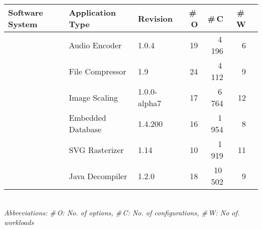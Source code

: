\begin{tabularx}{\linewidth}{lllrrrr}
		\toprule
		\textbf{Software System} &  \textbf{Application Type} & \textbf{Revision} & \textbf{ \#\,O} & \textbf{\#\,C} & \textbf{\#\,W}  \\
		\midrule
		\jumper & Audio Encoder & 1.0.4 & 19 & 4\,196 & 6   \\
		
		\kanzi & File Compressor & 1.9 & 24 & 4\,112 & 9 \\
			
		\dconvert & Image Scaling & 1.0.0-alpha7 & 17 & 6\,764 & 12  \\
				
		\htwo & Embedded Database & 1.4.200 & 16 & 1\,954  & 8  \\
		
		\batik & SVG Rasterizer & 1.14 & 10 & 1\,919 &  11  \\
		
		\jadx & Java Decompiler & 1.2.0 & 18 & 10\,502 & 9  \\
\bottomrule

\end{tabularx}\\
{\vspace{1mm}\textit{Abbreviations: \#\,O: No. of options, \#\,C: No. of configurations, \#\,W: No of. workloads}}
